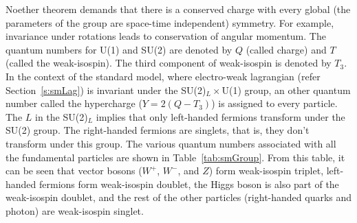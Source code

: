 Noether theorem \cite{Noether:1918zz} demands that there is a conserved charge 
with every global (the parameters of the group are space-time independent) symmetry. 
For example, invariance under rotations leads to conservation of angular momentum. 
The quantum numbers for U(1) and SU(2) are denoted by $Q$ (called charge) and $T$ 
(called the weak-isospin). The third component of weak-isospin is denoted by $T_3$. In 
the context of the standard model, where electro-weak lagrangian (refer Section~\ref{s:smLag}) 
is invariant under the SU(2)$_L\times $U(1) group, an other 
quantum number called the hypercharge ($Y = 2( Q - T_3)$) is assigned to every 
particle. The $L$ in the SU(2)$_L$ implies that only left-handed fermions 
transform under the SU(2) group. The right-handed fermions are singlets, that is, 
they don't transform under this group. The various quantum numbers
associated with all the fundamental particles are shown in Table~\ref{tab:smGroup}. 
From this table, it can be seen that vector bosons 
($W^+$, $W^-$, \rm{ and } $Z$) form weak-isospin triplet, left-handed fermions form weak-isospin 
doublet, the Higgs boson is also part of the weak-isospin doublet, and the rest of 
the other particles (right-handed quarks and photon) are weak-isospin singlet.
